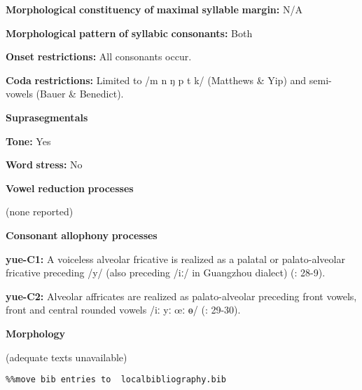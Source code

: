 \textbf{Morphological} \textbf{constituency} \textbf{of} \textbf{maximal} \textbf{syllable} \textbf{margin:} N/A

\textbf{Morphological} \textbf{pattern} \textbf{of} \textbf{syllabic} \textbf{consonants:} Both

\textbf{Onset} \textbf{restrictions:} All consonants occur.

\textbf{Coda} \textbf{restrictions:} Limited to /m n ŋ p t k/ (Matthews \& Yip) and semi-vowels (Bauer \& Benedict).

\textbf{Suprasegmentals}

\textbf{Tone:} Yes

\textbf{Word} \textbf{stress:} No

\textbf{Vowel} \textbf{reduction} \textbf{processes}

(none reported)

\textbf{Consonant} \textbf{allophony} \textbf{processes}

\textbf{yue-C1:} A voiceless alveolar fricative is realized as a palatal or palato-alveolar fricative preceding /y/ (also preceding /iː/ in Guangzhou dialect) (\citealt{BauerBenedict1997}: 28-9).

\textbf{yue-C2:} Alveolar affricates are realized as palato-alveolar preceding front vowels, front and central rounded vowels /iː yː œː ɵ/ (\citealt{BauerBenedict1997}: 29-30).

\textbf{Morphology}

(adequate texts unavailable)

\begin{verbatim}%%move bib entries to  localbibliography.bib
\end{verbatim} 
